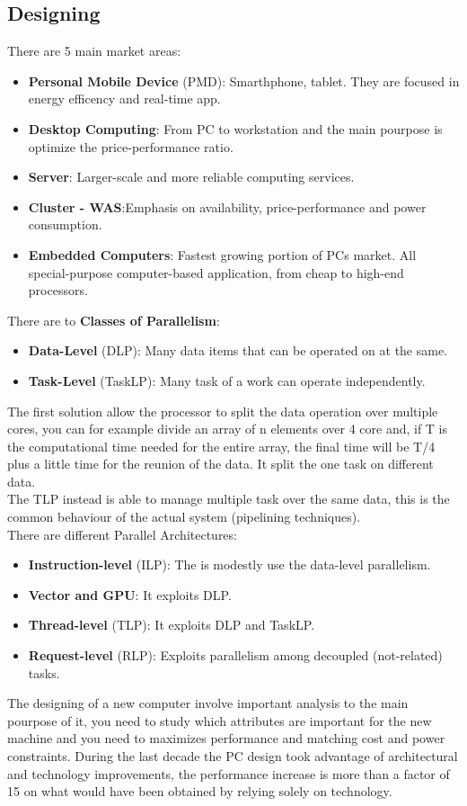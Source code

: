 \documentclass[12pt]{article}
\begin{document}
\subsection{Designing}
There are 5 main market areas:
\begin{itemize}
  \item \textbf{Personal Mobile Device} (PMD): Smarthphone, tablet. They are focused in energy efficency and real-time app.
  \item \textbf{Desktop Computing}: From PC to workstation and the main pourpose is optimize the price-performance ratio.
  \item \textbf{Server}: Larger-scale and more reliable computing services.
  \item \textbf{Cluster - WAS}:Emphasis on availability, price-performance and power consumption.
  \item \textbf{Embedded Computers}: Fastest growing portion of PCs market. All special-purpose computer-based application, from cheap to high-end processors.
\end{itemize}
There are to \textbf{Classes of Parallelism}:
\begin{itemize}
  \item \textbf{Data-Level} (DLP): Many data items that can be operated on at the same.
  \item \textbf{Task-Level} (TaskLP): Many task of a work can operate independently.
\end{itemize}
The first solution allow the processor to split the data operation over multiple cores, you can for example divide an array of n elements over 4 core and, if T is the computational time needed for the entire array, the final time will be T/4 plus a little time for the reunion of the data. It split the one task on different data.\\
The TLP instead is able to manage multiple task over the same data, this is the common behaviour of the actual system (pipelining techniques).\\
There are different Parallel Architectures:
\begin{itemize}
  \item \textbf{Instruction-level} (ILP): The is modestly use the data-level parallelism.
  \item \textbf{Vector and GPU}: It exploits DLP.
  \item \textbf{Thread-level} (TLP): It exploits DLP and TaskLP.
  \item \textbf{Request-level} (RLP): Exploits parallelism among decoupled (not-related) tasks.
\end{itemize}
The designing of a new computer involve important analysis to the main pourpose of it, you need to study which attributes are important for the new machine and you need to maximizes performance and matching cost and power constraints. During the last decade the PC design took advantage of architectural and technology improvements, the performance increase is more than a factor of 15 on what would have been obtained by relying solely on technology.\\
\end{document}

